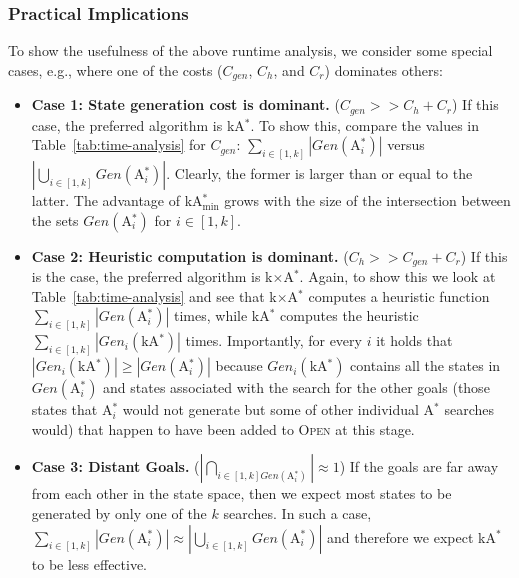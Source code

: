 \documentclass[twoside,11pt]{article}
\newcommand{\astar}{A$^*$\xspace}
\newcommand{\kastar}{kA$^*$\xspace}
\newcommand{\kastarvar}[1]{\textup{kA}$^*_{#1}$\xspace}
\newcommand{\kastarmin}{\kastarvar{\min}}
\newcommand{\kxastar}{k$\times$A$^*$\xspace}
\newcommand{\astari}[1]{A$^*_{#1}$\xspace}
\newcommand{\open}{\textsc{Open}\xspace}
\begin{document}
\subsubsection{Practical Implications}
To show the usefulness of the above runtime analysis, we  consider some special
cases, e.g.,  where one of the costs ($C_{gen}$, $C_{h}$, and $C_{r}$) dominates others:
\begin{itemize}
  \item \textbf{Case 1: State generation cost is dominant.} ($C_{gen}>>C_{h}+C_r$)
  If this case, the preferred algorithm is \kastar.
  To show this, compare the values in Table~\ref{tab:time-analysis} for $C_{gen}$: $\sum_{i\in[1,k]} |Gen(\text{\astari{i}})|$ versus $|\bigcup_{i\in[1,k]} Gen(\text{\astari{i}})|$.
  Clearly, the former is larger than or equal to the latter.
  The advantage of \kastarmin grows with the size of the intersection between the sets $Gen(\text{\astari{i}})$ for $i\in[1,k]$.

  \item \textbf{Case 2: Heuristic computation is dominant.} ($C_{h}>>C_{gen}+C_r$)
    If this is the case, the preferred algorithm is \kxastar.
    Again, to show this we look at Table~\ref{tab:time-analysis} and see that \kxastar computes a heuristic function $\sum_{i\in[1,k]} |Gen(\text{\astari{i}})|$ times, while \kastar computes the heuristic $\sum_{i\in[1,k]} |Gen_i(\text{\kastar})|$ times.
    Importantly, for every $i$ it holds that $|Gen_i(\text{\kastar})|\geq |Gen(\text{\astari{i}})|$ because $Gen_i(\text{\kastar})$ contains all the states in $Gen(\text{\astari{i}})$ and states associated with the search for the other goals (those states that \astari{i} would not generate but some of other individual \astar searches would) that happen to have been added to \open at this stage.

   \item \textbf{Case 3: Distant Goals.} ($|\bigcap_{i\in[1,k] Gen(\text{\astari{i}})}|\approx 1$)
   If the goals are far away from each other in the state space, then we expect most states to be generated by only one of the $k$ searches.
   In such a case, $\sum_{i\in[1,k]}|Gen(\text{\astari{i}})|\approx |\bigcup\limits_{i\in[1,k]} Gen(\text{\astari{i}})|$ and therefore we expect \kastar to be less effective.
\end{itemize}
\end{document}
